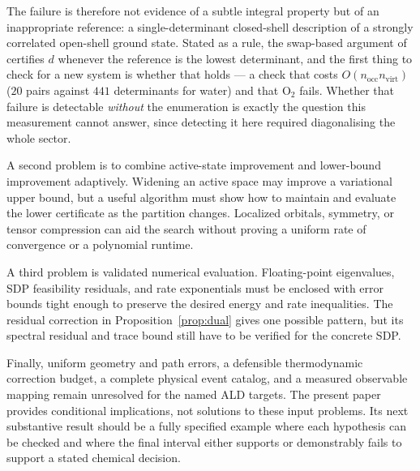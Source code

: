 The failure is therefore not evidence of a subtle integral property but of an
inappropriate reference: a single-determinant closed-shell description of a
strongly correlated open-shell ground state. Stated as a rule, the swap-based
argument of  certifies $d$ whenever the reference is the
lowest determinant, and the first thing to check for a new system is whether that
holds --- a check that costs $O(n_{\mathrm{occ}}n_{\mathrm{virt}})$
($20$ pairs against $441$ determinants for water) and that O$_2$ fails. Whether
that failure is detectable \emph{without} the enumeration is exactly the question
this measurement cannot answer, since detecting it here required diagonalising the
whole sector.

A second problem is to combine active-state improvement and lower-bound
improvement adaptively. Widening an active space may improve a variational
upper bound, but a useful algorithm must show how to maintain and evaluate
the lower certificate as the partition changes. Localized orbitals, symmetry,
or tensor compression can aid the search without proving a uniform rate of
convergence or a polynomial runtime.

A third problem is validated numerical evaluation. Floating-point eigenvalues,
SDP feasibility residuals, and rate exponentials must be enclosed with error
bounds tight enough to preserve the desired energy and rate inequalities.
The residual correction in Proposition~\ref{prop:dual} gives one possible
pattern, but its spectral residual and trace bound still have to be verified
for the concrete SDP.

Finally, uniform geometry and path errors, a defensible thermodynamic
correction budget, a complete physical event catalog, and a measured
observable mapping remain unresolved for the named ALD targets. The present
paper provides conditional implications, not solutions to these input
problems. Its next substantive result should be a fully specified example
where each hypothesis can be checked and where the final interval either
supports or demonstrably fails to support a stated chemical decision.
